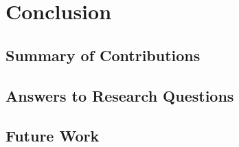 
\chapter{Conclusion}\label{ch:conclusion}

\section{Summary of Contributions}

\section{Answers to Research Questions}

\section{Future Work}
